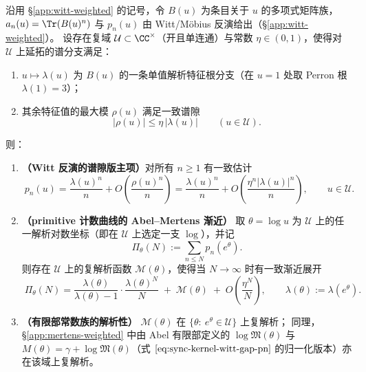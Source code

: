 \begin{proposition}\label{prop:sync-kernel-abel-mertens-analytic-family}
沿用 \S\ref{app:witt-weighted} 的记号，令 \(B(u)\) 为条目关于 \(u\) 的多项式矩阵族，
\(
a_n(u)=\Tr(B(u)^n)
\)
与 \(p_n(u)\) 由 Witt/Möbius 反演给出（\S\ref{app:witt-weighted}）。
设存在复域 \(\mathcal U\subset\CC^\times\)（开且单连通）与常数 \(\eta\in(0,1)\)，使得对 \(\mathcal U\) 上延拓的谱分支满足：
\begin{enumerate}
  \item \(u\mapsto \lambda(u)\) 为 \(B(u)\) 的一条单值解析特征根分支（在 \(u=1\) 处取 Perron 根 \(\lambda(1)=3\)）；
  \item 其余特征值的最大模 \(\rho(u)\) 满足一致谱隙
  \[
  \boxed{\ |\rho(u)|\le \eta\,|\lambda(u)|\qquad(u\in\mathcal U).\ }
  \]
\end{enumerate}
则：
\begin{enumerate}
  \item \textbf{（Witt 反演的谱隙版主项）}对所有 \(n\ge 1\) 有一致估计
  \begin{equation}\label{eq:sync-kernel-witt-gap-pn}
  \boxed{\;
  p_n(u)=\frac{\lambda(u)^n}{n}+O\!\left(\frac{\rho(u)^n}{n}\right)
  =\frac{\lambda(u)^n}{n}+O\!\left(\frac{\eta^n|\lambda(u)|^n}{n}\right),\qquad u\in\mathcal U.\;}
  \end{equation}
  \item \textbf{（primitive 计数曲线的 Abel--Mertens 渐近）}
  取 \(\theta=\log u\) 为 \(\mathcal U\) 上的任一解析对数坐标（即在 \(\mathcal U\) 上选定一支 \(\log\)），并记
  \[
  \Pi_\theta(N):=\sum_{n\le N}p_n(e^\theta).
  \]
  则存在 \(\mathcal U\) 上的复解析函数 \(\mathcal M(\theta)\)，使得当 \(N\to\infty\) 时有一致渐近展开
  \begin{equation}\label{eq:sync-kernel-abel-mertens-Pi}
  \boxed{\;
  \Pi_\theta(N)
  =\frac{\lambda(\theta)}{\lambda(\theta)-1}\cdot\frac{\lambda(\theta)^N}{N}\;+\;\mathcal M(\theta)\;+\;O\!\left(\frac{\eta^N}{N}\right),\qquad
  \lambda(\theta):=\lambda(e^\theta).\;}
  \end{equation}
  \item \textbf{（有限部常数族的解析性）}
  \(\mathcal M(\theta)\) 在 \(\{\theta:\ e^\theta\in\mathcal U\}\) 上复解析；
  同理，\S\ref{app:mertens-weighted} 中由 Abel 有限部定义的 \(\log\mathfrak{M}(\theta)\) 与 \(M(\theta)=\gamma+\log\mathfrak{M}(\theta)\)（式 \(\eqref{eq:sync-kernel-witt-gap-pn}\) 的归一化版本）亦在该域上复解析。
\end{enumerate}
\end{proposition}

